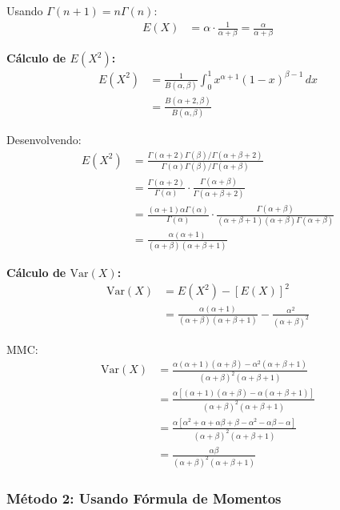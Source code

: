 \documentclass[12pt,a4paper]{article}
\theoremstyle{plain}
\theoremstyle{definition}
\theoremstyle{remark}
\begin{document}
Usando \(\Gamma(n+1) = n\Gamma(n)\):
\begin{align}
E(X) &= \alpha \cdot \frac{1}{\alpha+\beta} = \frac{\alpha}{\alpha+\beta}
\end{align}

\textbf{Cálculo de \(E(X^2)\):}
\begin{align}
E(X^2) &= \frac{1}{B(\alpha, \beta)} \int_0^1 x^{\alpha+1} (1-x)^{\beta-1} \, dx \\
&= \frac{B(\alpha+2, \beta)}{B(\alpha, \beta)}
\end{align}

Desenvolvendo:
\begin{align}
E(X^2) &= \frac{\Gamma(\alpha+2)\Gamma(\beta)/\Gamma(\alpha+\beta+2)}{\Gamma(\alpha)\Gamma(\beta)/\Gamma(\alpha+\beta)} \\
&= \frac{\Gamma(\alpha+2)}{\Gamma(\alpha)} \cdot \frac{\Gamma(\alpha+\beta)}{\Gamma(\alpha+\beta+2)} \\
&= \frac{(\alpha+1)\alpha \Gamma(\alpha)}{\Gamma(\alpha)} \cdot \frac{\Gamma(\alpha+\beta)}{(\alpha+\beta+1)(\alpha+\beta)\Gamma(\alpha+\beta)} \\
&= \frac{\alpha(\alpha+1)}{(\alpha+\beta)(\alpha+\beta+1)}
\end{align}

\textbf{Cálculo de \(\text{Var}(X)\):}
\begin{align}
\text{Var}(X) &= E(X^2) - [E(X)]^2 \\
&= \frac{\alpha(\alpha+1)}{(\alpha+\beta)(\alpha+\beta+1)} - \frac{\alpha^2}{(\alpha+\beta)^2}
\end{align}

MMC:
\begin{align}
\text{Var}(X) &= \frac{\alpha(\alpha+1)(\alpha+\beta) - \alpha^2(\alpha+\beta+1)}{(\alpha+\beta)^2(\alpha+\beta+1)} \\
&= \frac{\alpha[(\alpha+1)(\alpha+\beta) - \alpha(\alpha+\beta+1)]}{(\alpha+\beta)^2(\alpha+\beta+1)} \\
&= \frac{\alpha[\alpha^2+\alpha+\alpha\beta+\beta - \alpha^2-\alpha\beta-\alpha]}{(\alpha+\beta)^2(\alpha+\beta+1)} \\
&= \frac{\alpha\beta}{(\alpha+\beta)^2(\alpha+\beta+1)}
\end{align}

\subsubsection{Método 2: Usando Fórmula de Momentos}
\end{document}
